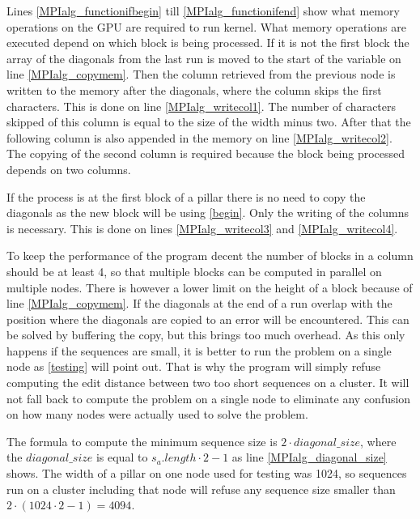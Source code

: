 Lines \ref{MPIalg_functionifbegin} till \ref{MPIalg_functionifend} show what memory operations on the GPU are required to run kernel.
What memory operations are executed depend on which block is being processed.
If it is not the first block the array of the diagonals from the last run is moved to the start of the variable on line \ref{MPIalg_copymem}.
Then the column retrieved from the previous node is written to the memory after the diagonals, where the column skips the first characters.
This is done on line \ref{MPIalg_writecol1}.
The number of characters skipped of this column is equal to the size of the width minus two.
After that the following column is also appended in the memory on line \ref{MPIalg_writecol2}.
The copying of the second column is required because the block being processed depends on two columns.

If the process is at the first block of a pillar there is no need to copy the diagonals as the new block will be using \cref{begin}.
Only the writing of the columns is necessary.
This is done on lines \ref{MPIalg_writecol3} and \ref{MPIalg_writecol4}.

To keep the performance of the program decent the number of blocks in a column should be at least 4, so that multiple blocks can be computed in parallel on multiple nodes.
There is however a lower limit on the height of a block because of line \ref{MPIalg_copymem}.
If the diagonals at the end of a run overlap with the position where the diagonals are copied to an error will be encountered.
This can be solved by buffering the copy, but this brings too much overhead.
As this only happens if the sequences are small, it is better to run the problem on a single node as \cref{testing} will point out.
That is why the program will simply refuse computing the edit distance between two too short sequences on a cluster.
It will not fall back to compute the problem on a single node to eliminate any confusion on how many nodes were actually used to solve the problem.

The formula to compute the minimum sequence size is $2 \cdot diagonal\_size$, where the $diagonal\_size$ is equal to $s_a.length \cdot 2 - 1$ as line \ref{MPIalg_diagonal_size} shows.
The width of a pillar on one node used for testing was 1024, so sequences run on a cluster including that node will refuse any sequence size smaller than $2 \cdot (1024 \cdot 2 - 1) = 4094$.
